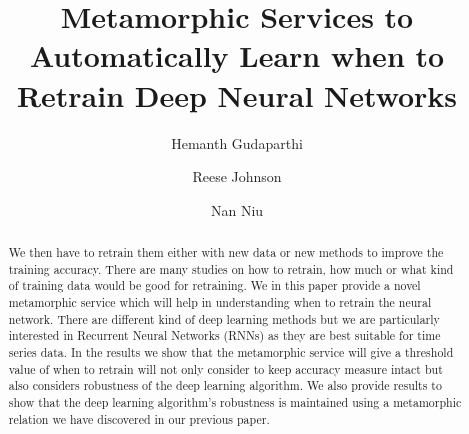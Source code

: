 \documentclass[sigconf,authordraft]{acmart}
\begin{document}
\title{Metamorphic Services to Automatically Learn when to Retrain Deep Neural Networks}

\author{Hemanth Gudaparthi}
\authornotemark[1]

\author{Reese Johnson}

\author{Nan Niu}
 
\renewcommand{\shortauthors}{H. Gudaparthi, et al.}

\begin{abstract}
   We then have to retrain them either with new data or new methods to improve the training accuracy. There are many studies on how to retrain, how much or what kind of training data would be good for retraining. We in this paper provide a novel metamorphic service which will help in understanding when to retrain the neural network. There are different kind of deep learning methods but we are particularly interested in Recurrent Neural Networks (RNNs) as they are best suitable for time series data. In the results we show that the metamorphic service will give a threshold value of when to retrain will not only consider to keep accuracy measure intact but also considers robustness of the deep learning algorithm. We also provide results to show that the deep learning algorithm's robustness is maintained using a metamorphic relation we have discovered in our previous paper.
\end{abstract}
\end{document}
